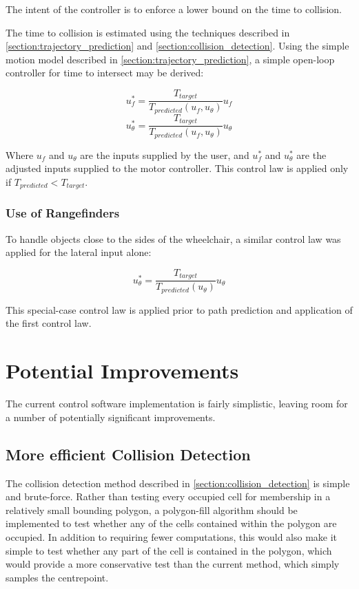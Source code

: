\documentclass[oneside,final,a4paper]{report}
\begin{document}
The intent of the controller is to enforce a lower bound on the time to collision.  

The time to collision is estimated using the techniques described in \ref{section:trajectory_prediction} and \ref{section:collision_detection}.  Using the simple motion model described in \ref{section:trajectory_prediction}, a simple open-loop controller for time to intersect may be derived:

\begin{equation}
u_f^* = \frac{T_{target}}{T_{predicted}(u_f, u_\theta)} u_f
\end{equation}
\begin{equation}
u_\theta^* = \frac{T_{target}}{T_{predicted}(u_f, u_\theta)} u_\theta
\end{equation}

Where $u_f$ and $u_\theta$ are the inputs supplied by the user, and $u_f^*$ and $u_\theta^*$ are the adjusted inputs supplied to the motor controller.  This control law is applied only if $T_{predicted} < T_{target}$.

\subsubsection{Use of Rangefinders}
To handle objects close to the sides of the wheelchair, a similar control law was applied for the lateral input alone:

\begin{equation}
u_\theta^* = \frac{T_{target}}{T_{predicted}(u_\theta)} u_\theta
\end{equation}

This special-case control law is applied prior to path prediction and application of the first control law.

\section{Potential Improvements}
The current control software implementation is fairly simplistic, leaving room for a number of potentially significant improvements.

\subsection{More efficient Collision Detection}
The collision detection method described in \ref{section:collision_detection} is simple and brute-force.  Rather than testing every occupied cell for membership in a relatively small bounding polygon, a polygon-fill algorithm should be implemented to test whether any of the cells contained within the polygon are occupied.  In addition to requiring fewer computations, this would also make it simple to test whether any part of the cell is contained in the polygon, which would provide a more conservative test than the current method, which simply samples the centrepoint.
\end{document}
